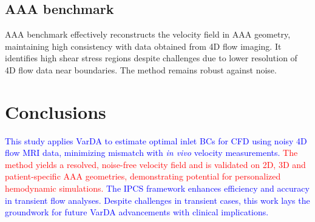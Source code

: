 \subsection*{AAA benchmark}
AAA benchmark effectively reconstructs the velocity field in AAA geometry, maintaining high consistency with data obtained from 4D flow
imaging. It identifies high shear stress regions despite challenges due to lower resolution of 4D flow data near boundaries. The method remains robust against noise. 

\section*{Conclusions}
\textcolor{blue}{This study applies VarDA to estimate optimal inlet BCs for CFD using noisy 4D flow MRI data, minimizing mismatch with \textit{in vivo} velocity measurements.}  
\textcolor{red}{The method yields a resolved, noise-free velocity field and is validated on 2D, 3D and patient-specific AAA geometries, demonstrating potential for personalized hemodynamic simulations.}  
\textcolor{blue}{The IPCS framework enhances efficiency and accuracy in transient flow analyses. Despite challenges in transient cases, this work lays the groundwork for future VarDA advancements with clinical implications.}  






